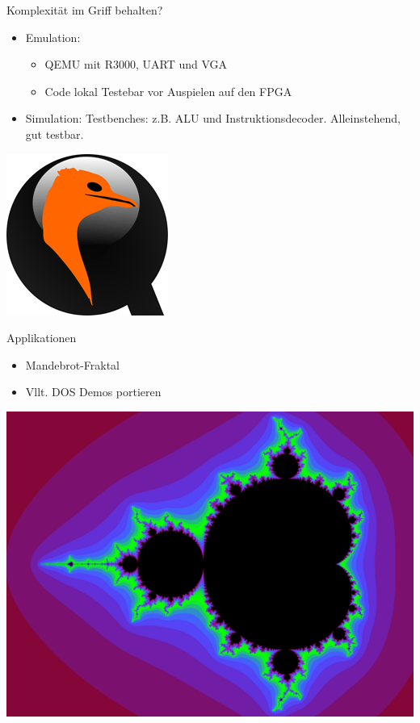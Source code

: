 \begin{frame}{Komplexität im Griff behalten?}

\begin{itemize}
\item Emulation:
\begin{itemize}
    \item QEMU mit R3000, UART und VGA
    \item Code lokal Testebar vor Auspielen auf den FPGA
\end{itemize}
    \item Simulation: Testbenches: z.B. ALU und Instruktionsdecoder. Alleinstehend, gut testbar.
\end{itemize}
\begin{center}
\includegraphics[scale=0.85]{qemu.png}
\end{center}



\end{frame}


\begin{frame}{Applikationen}
\begin{itemize}
\item Mandebrot-Fraktal
\item Vllt. DOS Demos portieren
\end{itemize}

\begin{center}
\includegraphics[keepaspectratio=true,width=0.40\paperwidth]{mandelbrot.png}
\end{center}


\end{frame}


